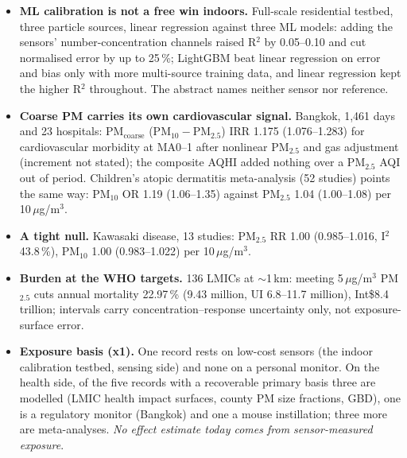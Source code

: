 \documentclass[10pt]{article}
\begin{document}
\footnotesize
\begin{itemize}

\item \textbf{ML calibration is not a free win indoors.} Full-scale residential testbed, three particle sources, linear regression against three ML models: adding the sensors' number-concentration channels raised R$^2$ by 0.05--0.10 and cut normalised error by up to 25\,\%; LightGBM beat linear regression on error and bias only with more multi-source training data, and linear regression kept the higher R$^2$ throughout. The abstract names neither sensor nor reference.

\item \textbf{Coarse PM carries its own cardiovascular signal.} Bangkok, 1,461 days and 23 hospitals: PM$_{\mathrm{coarse}}$ (PM$_{10}-$PM$_{2.5}$) IRR 1.175 (1.076--1.283) for cardiovascular morbidity at MA0--1 after nonlinear PM$_{2.5}$ and gas adjustment (increment not stated); the composite AQHI added nothing over a PM$_{2.5}$ AQI out of period. Children's atopic dermatitis meta-analysis (52 studies) points the same way: PM$_{10}$ OR 1.19 (1.06--1.35) against PM$_{2.5}$ 1.04 (1.00--1.08) per 10\,$\mu$g/m$^3$.

\item \textbf{A tight null.} Kawasaki disease, 13 studies: PM$_{2.5}$ RR 1.00 (0.985--1.016, I$^2$ 43.8\,\%), PM$_{10}$ 1.00 (0.983--1.022) per 10\,$\mu$g/m$^3$.

\item \textbf{Burden at the WHO targets.} 136 LMICs at $\sim$1\,km: meeting 5\,$\mu$g/m$^3$ PM$_{2.5}$ cuts annual mortality 22.97\,\% (9.43 million, UI 6.8--11.7 million), Int\$8.4 trillion; intervals carry concentration--response uncertainty only, not exposure-surface error.

\item \textbf{Exposure basis (x1).} One record rests on low-cost sensors (the indoor calibration testbed, sensing side) and none on a personal monitor. On the health side, of the five records with a recoverable primary basis three are modelled (LMIC health impact surfaces, county PM size fractions, GBD), one is a regulatory monitor (Bangkok) and one a mouse instillation; three more are meta-analyses. \emph{No effect estimate today comes from sensor-measured exposure}.

\end{itemize}

\vspace{2mm}
\end{document}
